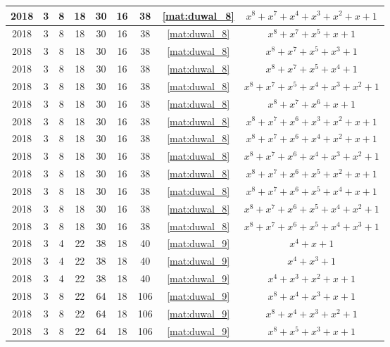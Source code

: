 \begin{longtable}{|c|c|c|c|c|c|c|c|c|}
2018 & 3 & 8 & 18 & 30 & 16 & 38 & \eqref{mat:duwal_8} & $x^8 + x^7 + x^4 + x^3 + x^2 + x + 1$ \\ \hline 
2018 & 3 & 8 & 18 & 30 & 16 & 38 & \eqref{mat:duwal_8} & $x^8 + x^7 + x^5 + x + 1$ \\ \hline 
2018 & 3 & 8 & 18 & 30 & 16 & 38 & \eqref{mat:duwal_8} & $x^8 + x^7 + x^5 + x^3 + 1$ \\ \hline 
2018 & 3 & 8 & 18 & 30 & 16 & 38 & \eqref{mat:duwal_8} & $x^8 + x^7 + x^5 + x^4 + 1$ \\ \hline 
2018 & 3 & 8 & 18 & 30 & 16 & 38 & \eqref{mat:duwal_8} & $x^8 + x^7 + x^5 + x^4 + x^3 + x^2 + 1$ \\ \hline 
2018 & 3 & 8 & 18 & 30 & 16 & 38 & \eqref{mat:duwal_8} & $x^8 + x^7 + x^6 + x + 1$ \\ \hline 
2018 & 3 & 8 & 18 & 30 & 16 & 38 & \eqref{mat:duwal_8} & $x^8 + x^7 + x^6 + x^3 + x^2 + x + 1$ \\ \hline 
2018 & 3 & 8 & 18 & 30 & 16 & 38 & \eqref{mat:duwal_8} & $x^8 + x^7 + x^6 + x^4 + x^2 + x + 1$ \\ \hline 
2018 & 3 & 8 & 18 & 30 & 16 & 38 & \eqref{mat:duwal_8} & $x^8 + x^7 + x^6 + x^4 + x^3 + x^2 + 1$ \\ \hline 
2018 & 3 & 8 & 18 & 30 & 16 & 38 & \eqref{mat:duwal_8} & $x^8 + x^7 + x^6 + x^5 + x^2 + x + 1$ \\ \hline 
2018 & 3 & 8 & 18 & 30 & 16 & 38 & \eqref{mat:duwal_8} & $x^8 + x^7 + x^6 + x^5 + x^4 + x + 1$ \\ \hline 
2018 & 3 & 8 & 18 & 30 & 16 & 38 & \eqref{mat:duwal_8} & $x^8 + x^7 + x^6 + x^5 + x^4 + x^2 + 1$ \\ \hline 
2018 & 3 & 8 & 18 & 30 & 16 & 38 & \eqref{mat:duwal_8} & $x^8 + x^7 + x^6 + x^5 + x^4 + x^3 + 1$ \\ \hline 
2018 & 3 & 4 & 22 & 38 & 18 & 40 & \eqref{mat:duwal_9} & $x^4 + x + 1$ \\ \hline 
2018 & 3 & 4 & 22 & 38 & 18 & 40 & \eqref{mat:duwal_9} & $x^4 + x^3 + 1$ \\ \hline 
2018 & 3 & 4 & 22 & 38 & 18 & 40 & \eqref{mat:duwal_9} & $x^4 + x^3 + x^2 + x + 1$ \\ \hline 
2018 & 3 & 8 & 22 & 64 & 18 & 106 & \eqref{mat:duwal_9} & $x^8 + x^4 + x^3 + x + 1$ \\ \hline 
2018 & 3 & 8 & 22 & 64 & 18 & 106 & \eqref{mat:duwal_9} & $x^8 + x^4 + x^3 + x^2 + 1$ \\ \hline 
2018 & 3 & 8 & 22 & 64 & 18 & 106 & \eqref{mat:duwal_9} & $x^8 + x^5 + x^3 + x + 1$ \\ \hline 

\end{longtable}
